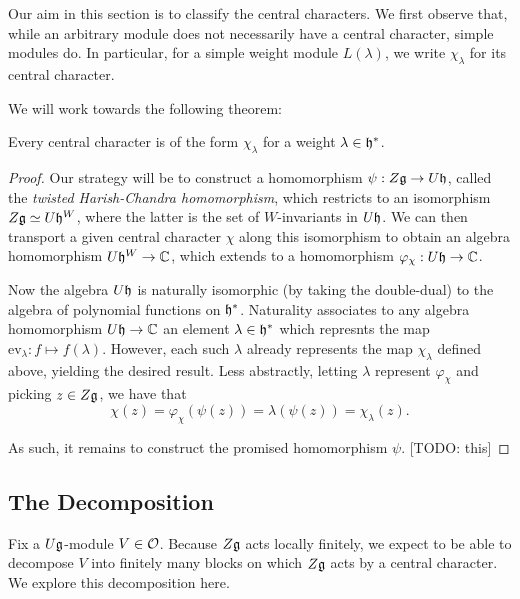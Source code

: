 \documentclass[11pt]{article}
\begin{document}
Our aim in this section is to classify the central characters.
We first observe that, while an arbitrary module does not necessarily have a
central character, simple modules do. In particular, for a simple weight module
$L(\lambda)$, we write $\chi_\lambda$ for its central character.

We will work towards the following theorem:

\begin{thm}\label{thm:harish-chandra}
	Every central character is of the form $\chi_\lambda$ for a weight
	$\lambda\in\mathfrak{h}^*$.
\end{thm}

\begin{proof}
	Our strategy will be to construct a homomorphism $\psi: Z\mathfrak{g}\rightarrow U\mathfrak{h}$,
	called the \emph{twisted Harish-Chandra homomorphism}, which restricts to an
	isomorphism $Z\mathfrak{g}\simeq U\mathfrak{h}^W$, where the latter is the set of $W$-invariants
	in $U\mathfrak{h}$. We can then transport a given central character $\chi$ along this
	isomorphism to obtain an algebra homomorphism $U\mathfrak{h}^W\rightarrow\mathbb{C}$, which
	extends to a homomorphism $\varphi_\chi: U\mathfrak{h}\rightarrow\mathbb{C}$.

	Now the algebra $U\mathfrak{h}$ is naturally isomorphic (by taking the double-dual) to
	the algebra of polynomial functions on $\mathfrak{h}^*$. Naturality associates to any
	algebra homomorphism $U\mathfrak{h}\rightarrow\mathbb{C}$ an element $\lambda\in\mathfrak{h}^*$ which
	represnts the map $\text{ev}_\lambda: f\mapsto f(\lambda)$. However, each such
	$\lambda$ already represents the map $\chi_\lambda$ defined above, yielding the
	desired result. Less abstractly, letting $\lambda$
	represent $\varphi_\chi$ and picking $z\in Z\mathfrak{g}$, we have that \[
		\chi(z) = \varphi_\chi(\psi(z)) = \lambda(\psi(z)) = \chi_\lambda(z).
	\]

	As such, it remains to construct the promised homomorphism $\psi$. [TODO: this]
\end{proof}


\subsection{The Decomposition}

Fix a $U\mathfrak{g}$-module $V\in\mathcal{O}$. Because $Z\mathfrak{g}$ acts locally finitely, we expect
to be able to decompose $V$ into finitely many blocks on which $Z\mathfrak{g}$ acts by a
central character. We explore this decomposition here.
\end{document}
